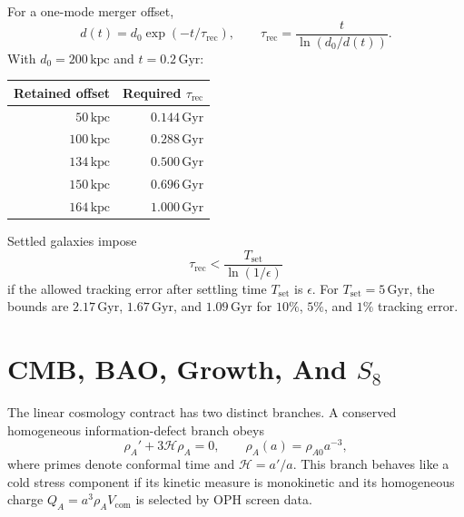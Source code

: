 \documentclass[11pt]{article}
\begin{document}
For a one-mode merger offset,
\begin{equation}
  d(t)=d_0\exp(-t/\tau_{\mathrm{rec}}),
  \qquad
  \tau_{\mathrm{rec}}=\frac{t}{\ln(d_0/d(t))}.
\end{equation}
With \(d_0=200\,\mathrm{kpc}\) and \(t=0.2\,\mathrm{Gyr}\):
\begin{center}
\begin{tabular}{@{}rr@{}}
\toprule
Retained offset & Required \(\tau_{\mathrm{rec}}\) \\
\midrule
\(50\,\mathrm{kpc}\) & \(0.144\,\mathrm{Gyr}\) \\
\(100\,\mathrm{kpc}\) & \(0.288\,\mathrm{Gyr}\) \\
\(134\,\mathrm{kpc}\) & \(0.500\,\mathrm{Gyr}\) \\
\(150\,\mathrm{kpc}\) & \(0.696\,\mathrm{Gyr}\) \\
\(164\,\mathrm{kpc}\) & \(1.000\,\mathrm{Gyr}\) \\
\bottomrule
\end{tabular}
\end{center}
Settled galaxies impose
\begin{equation}
  \tau_{\mathrm{rec}}<\frac{T_{\mathrm{set}}}{\ln(1/\epsilon)}
\end{equation}
if the allowed tracking error after settling time \(T_{\mathrm{set}}\) is
\(\epsilon\).  For \(T_{\mathrm{set}}=5\,\mathrm{Gyr}\), the bounds are
\(2.17\,\mathrm{Gyr}\), \(1.67\,\mathrm{Gyr}\), and \(1.09\,\mathrm{Gyr}\)
for \(10\%\), \(5\%\), and \(1\%\) tracking error.

\section{CMB, BAO, Growth, And \(S_8\)}

The linear cosmology contract has two distinct branches.  A conserved
homogeneous information-defect branch obeys
\begin{equation}
  \rho_A' + 3\mathcal H\rho_A=0,
  \qquad
  \rho_A(a)=\rho_{A0}a^{-3},
  \label{eq:conservedbranch}
\end{equation}
where primes denote conformal time and \(\mathcal H=a'/a\).  This branch
behaves like a cold stress component if its kinetic measure is monokinetic and
its homogeneous charge \(Q_A=a^3\rho_A V_{\mathrm{com}}\) is selected by OPH
screen data.
\end{document}
